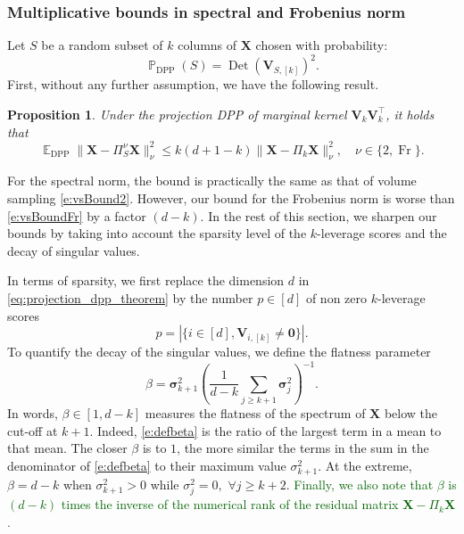 \documentclass[twoside,11pt]{book}
\newcommand{\rev}[1]{\textcolor{darkgreen}{#1}}
\newtheorem{proposition}{Proposition}
\numberwithin{theorem}{chapter}
\numberwithin{definition}{chapter}
\numberwithin{proposition}{chapter}
\numberwithin{corollary}{chapter}
\numberwithin{example}{chapter}
\numberwithin{lemma}{chapter}
\DeclareMathOperator{\Det}{Det}
\DeclareMathOperator{\Fr}{\mathrm{Fr}}
\DeclareMathOperator{\DPP}{\mathrm{DPP}}
\DeclareMathOperator{\Tran}{\intercal}
\DeclareMathOperator{\EX}{\mathbb{E}}
\DeclareMathOperator{\Prb}{\mathbb{P}}
\begin{document}
\subsubsection{Multiplicative bounds in spectral and Frobenius norm}
\label{sec:new_results_randomized}
Let $S$ be a random subset of $k$ columns of $\bm{X}$ chosen with probability:
\begin{equation}
	\Prb_{\DPP}(S) = \Det(\bm{V}_{S,[k]})^{2}.
\end{equation}
First, without any further assumption, we have the following result.
\begin{proposition}
    \label{projection_dpp_theorem}
    Under the projection DPP of marginal kernel $\bm{V}^{}_{k}\bm{V}^{\Tran}_{k}$, it holds that
    \begin{equation}
    	\label{eq:projection_dpp_theorem}
    	\EX_{\DPP} \| \bm{X} - \Pi_{S}^{\nu}\bm{X} \|_{\nu}^{2} \leq k(d+1-k)\| \bm{X} - \Pi_{k}\bm{X} \|_{\nu}^{2}, \quad \nu\in\{2,\Fr\}.
    \end{equation}
\end{proposition}
For the spectral norm, the bound is practically the same as that of volume sampling \eqref{e:vsBound2}. However, our bound for the Frobenius norm is worse than \eqref{e:vsBoundFr} by a factor $(d-k)$. In the rest of this section, we sharpen our bounds by taking into account the sparsity level of the $k$-leverage scores and the decay of singular values.

In terms of sparsity, we first replace the dimension $d$ in \eqref{eq:projection_dpp_theorem} by the number $p\in[d]$ of non zero $k$-leverage scores
\begin{equation}
  p = \left| \{i \in [d], \bm{V}_{i,[k]} \neq \bm{0}\}\right|.
  \label{e:defp}
\end{equation}
To quantify the decay of the singular values, we define the flatness parameter
\begin{equation}
  \beta = \bm{\sigma}_{k+1}^{2} \left(\frac{1}{d-k} \sum\limits_{j \geq k+1} \bm{\sigma}_{j}^{2}\right)^{-1}.
  \label{e:defbeta}
\end{equation}
In words, $\beta\in[1,d-k]$ measures the flatness of the spectrum of $\bm{X}$ below the cut-off at $k+1$. Indeed, \eqref{e:defbeta} is the ratio of the largest term in a mean to that mean. The closer $\beta$ is to $1$, the more similar the terms in the sum in the denominator of \eqref{e:defbeta} to their maximum value $\sigma_{k+1}^{2}$. At the extreme, $\beta=d-k$ when $\sigma^2_{k+1}>0$ while $\sigma_j^2=0,$ $\forall j\geq k+2$. \rev{Finally, we also note that $\beta$ is $(d-k)$ times the inverse of the numerical rank \citep{RuVe07} of the residual matrix $\bm{X}-\Pi_{k}\bm{X}$.}
\end{document}
